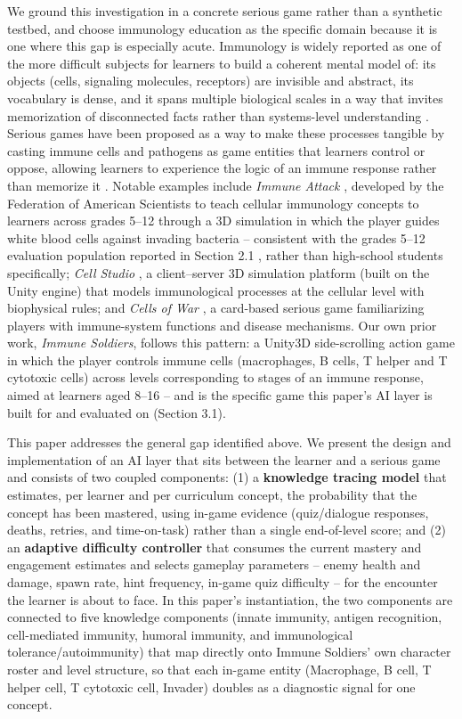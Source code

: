 \documentclass[11pt]{article}
\begin{document}
We ground this investigation in a concrete serious game rather than a synthetic testbed, and choose immunology education as the specific domain because it is one where this gap is especially acute. Immunology is widely reported as one of the more difficult subjects for learners to build a coherent mental model of: its objects (cells, signaling molecules, receptors) are invisible and abstract, its vocabulary is dense, and it spans multiple biological scales in a way that invites memorization of disconnected facts rather than systems-level understanding \cite{ref5}. Serious games have been proposed as a way to make these processes tangible by casting immune cells and pathogens as game entities that learners control or oppose, allowing learners to experience the logic of an immune response rather than memorize it \cite{ref6,ref7}. Notable examples include \textit{Immune Attack} \cite{ref8}, developed by the Federation of American Scientists to teach cellular immunology concepts to learners across grades 5--12 through a 3D simulation in which the player guides white blood cells against invading bacteria -- consistent with the grades 5--12 evaluation population reported in Section 2.1 \cite{ref28}, rather than high-school students specifically; \textit{Cell Studio} \cite{ref6}, a client--server 3D simulation platform (built on the Unity engine) that models immunological processes at the cellular level with biophysical rules; and \textit{Cells of War} \cite{ref7}, a card-based serious game familiarizing players with immune-system functions and disease mechanisms. Our own prior work, \textit{Immune Soldiers}, follows this pattern: a Unity3D side-scrolling action game in which the player controls immune cells (macrophages, B cells, T helper and T cytotoxic cells) across levels corresponding to stages of an immune response, aimed at learners aged 8--16 \cite{ref9} -- and is the specific game this paper's AI layer is built for and evaluated on (Section 3.1).

This paper addresses the general gap identified above. We present the design and implementation of an AI layer that sits between the learner and a serious game and consists of two coupled components: (1) a \textbf{knowledge tracing model} that estimates, per learner and per curriculum concept, the probability that the concept has been mastered, using in-game evidence (quiz/dialogue responses, deaths, retries, and time-on-task) rather than a single end-of-level score; and (2) an \textbf{adaptive difficulty controller} that consumes the current mastery and engagement estimates and selects gameplay parameters -- enemy health and damage, spawn rate, hint frequency, in-game quiz difficulty -- for the encounter the learner is about to face. In this paper's instantiation, the two components are connected to five knowledge components (innate immunity, antigen recognition, cell-mediated immunity, humoral immunity, and immunological tolerance/autoimmunity) that map directly onto Immune Soldiers' own character roster and level structure, so that each in-game entity (Macrophage, B cell, T helper cell, T cytotoxic cell, Invader) doubles as a diagnostic signal for one concept.
\end{document}
